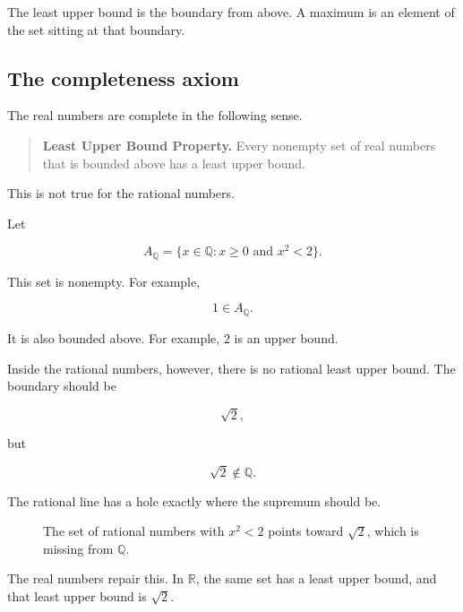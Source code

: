 The least upper bound is the boundary from above.  A maximum is an element of the
set sitting at that boundary.

\subsection{The completeness axiom}
\label{appsubsec:completeness-axiom}

The real numbers are complete in the following sense.

\begin{quote}
\textbf{Least Upper Bound Property.}
Every nonempty set of real numbers that is bounded above has a least upper bound.
\end{quote}

This is not true for the rational numbers.

Let

\[
A_{\mathbb Q}=\{x\in\mathbb Q:x\ge0\text{ and }x^2<2\}.
\]

This set is nonempty.  For example,

\[
1\in A_{\mathbb Q}.
\]

It is also bounded above.  For example, \(2\) is an upper bound.

Inside the rational numbers, however, there is no rational least upper bound.  The
boundary should be

\[
\sqrt2,
\]

but

\[
\sqrt2\notin\mathbb Q.
\]

The rational line has a hole exactly where the supremum should be.

\begin{figure}[h]
\centering
{}
\caption{The set of rational numbers with \(x^2<2\) points toward \(\sqrt2\), which is missing from \(\mathbb Q\).}
\label{fig:rational-hole-sqrt2}
\end{figure}

The real numbers repair this.  In \(\mathbb R\), the same set has a least upper bound,
and that least upper bound is \(\sqrt2\).

